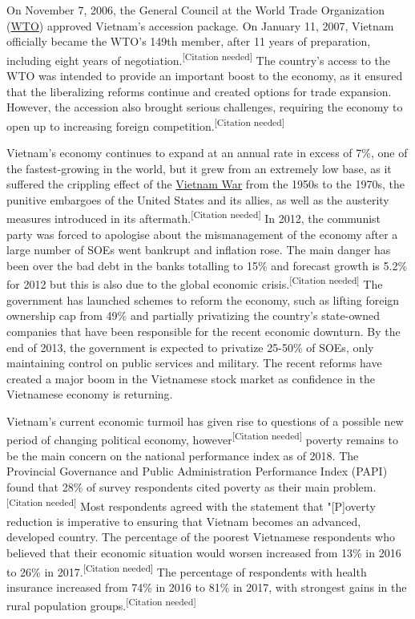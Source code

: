 \documentclass{article}
\begin{document}
On November 7, 2006, the General Council at the World Trade Organization (\href{https://en.wikipedia.org/wiki/WTO}{WTO}) approved Vietnam's accession package. On January 11, 2007, Vietnam officially became the WTO's 149th member, after 11 years of preparation, including eight years of negotiation.\textsuperscript{[Citation needed]} The country's access to the WTO was intended to provide an important boost to the economy, as it ensured that the liberalizing reforms continue and created options for trade expansion. However, the accession also brought serious challenges, requiring the economy to open up to increasing foreign competition.\textsuperscript{[Citation needed]}

Vietnam's economy continues to expand at an annual rate in excess of 7\%, one of the fastest-growing in the world, but it grew from an extremely low base, as it suffered the crippling effect of the \href{https://en.wikipedia.org/wiki/Vietnam_War}{Vietnam War} from the 1950s to the 1970s, the punitive embargoes of the United States and its allies, as well as the austerity measures introduced in its aftermath.\textsuperscript{[Citation needed]} In 2012, the communist party was forced to apologise about the mismanagement of the economy after a large number of SOEs went bankrupt and inflation rose. The main danger has been over the bad debt in the banks totalling to 15\% and forecast growth is 5.2\% for 2012 but this is also due to the global economic crisis.\textsuperscript{[Citation needed]} The government has launched schemes to reform the economy, such as lifting foreign ownership cap from 49\% and partially privatizing the country's state-owned companies that have been responsible for the recent economic downturn. By the end of 2013, the government is expected to privatize 25-50\% of SOEs, only maintaining control on public services and military. The recent reforms have created a major boom in the Vietnamese stock market as confidence in the Vietnamese economy is returning.

Vietnam's current economic turmoil has given rise to questions of a possible new period of changing political economy, however\textsuperscript{[Citation needed]} poverty remains to be the main concern on the national performance index as of 2018. The Provincial Governance and Public Administration Performance Index (PAPI) found that 28\% of survey respondents cited poverty as their main problem.\textsuperscript{[Citation needed]} Most respondents agreed with the statement that "[P]overty reduction is imperative to ensuring that Vietnam becomes an advanced, developed country. The percentage of the poorest Vietnamese respondents who believed that their economic situation would worsen increased from 13\% in 2016 to 26\% in 2017.\textsuperscript{[Citation needed]} The percentage of respondents with health insurance increased from 74\% in 2016 to 81\% in 2017, with strongest gains in the rural population groups.\textsuperscript{[Citation needed]}
\end{document}
